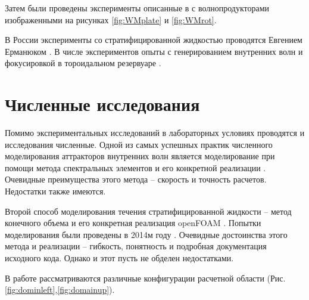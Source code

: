 Затем были проведены эксперименты описанные в \cite{Brouzet_2016,Brouzet2016,brouzet1997laboratory} с волнопродукторами изображенными на рисунках \ref{fig:WMplate} и \ref{fig:WMrot}. 

В России эксперименты со стратифицированной жидкостью проводятся Евгением Ерманюком \cite{Shmakova2019}. В числе экспериментов опыты с генерированием внутренних волн \cite{Shmakova2017} и фокусировкой в тороидальном резервуаре \cite{Ermanyuk2017}.  

\section{Численные исследования}

Помимо экспериментальных исследований в лабораторных условиях проводятся и исследования численные. Одной из самых успешных практик численного моделирования аттракторов внутренних волн является моделирование при помощи метода спектральных элементов \cite{Brouzet2016} и его конкретной реализации \cite{NEK5000}. Очевидные преимущества этого метода -- скорость и точность расчетов. Недостатки также имеются.

Второй способ моделирования течения стратифицированной жидкости -- метод конечного объема и его конкретная реализация openFOAM \cite{OpenFOAM}. Попытки моделирования были проведены в 2014м году \cite{Brouzet2014}. Очевидные достоинства этого метода и реализации -- гибкость, понятность и подробная документация исходного кода. Однако и этот пусть не обделен недостатками.

В работе рассматриваются различные конфигурации расчетной области (Рис. \ref{fig:dominleft},\ref{fig:domainup}).

